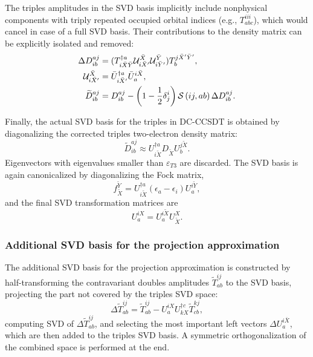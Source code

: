 \documentclass[a4paper,12pt,oneside]{book}
\newcommand{\half}{\frac{1}{2}}
\newcommand{\sop}[1]{{\cal S}\left(#1\right)}
\begin{document}
The triples amplitudes in the SVD basis implicitly include nonphysical 
components with triply repeated occupied orbital indices (e.g., $T_{abc}^{iii}$),
which would cancel in case of a full SVD basis. 
Their contributions to the density matrix can be explicitly isolated and removed:
\begin{equation}
\begin{aligned}
  \Delta D^{aj}_{ib} &= (T^{\dagger a}_{i \bar X \bar Y} \mathcal{U}^{\bar X}_{i \bar X'} \mathcal{U}^{\bar Y}_{i\bar Y'}) T^{j \bar X' \bar Y'}_{b},\\
  \mathcal{U}^{\bar X }_{i\bar X'} &= \bar U^{\dagger a}_{i \bar X'} \bar U^{i \bar X}_{a},\\
  \widetilde{D}^{aj}_{ib} &= D^{aj}_{ib} - \left(1 - \half\delta^i_j \right) \sop{ij,ab} \Delta D^{aj}_{ib}.
\end{aligned}
\end{equation}

Finally, the actual SVD basis for the triples in DC-CCSDT is obtained by 
diagonalizing the corrected triples two-electron density matrix:
\begin{equation}
\widetilde{D}^{aj}_{ib} \approx U^{\dagger a}_{i \tilde{X}} D_{\tilde{X}}
U^{j\tilde{X}}_{b}.
\end{equation}
Eigenvectors with eigenvalues smaller than $\varepsilon_{T3}$ are discarded.
The SVD basis is again canonicalized by diagonalizing the Fock matrix,
\begin{equation}
f_{\tilde{X}}^{\tilde{Y}}=U_{i\tilde{X}}^{\dagger a}
(\epsilon_a - \epsilon_i)U^{i\tilde{Y}}_{a},
\end{equation}
and the final SVD transformation matrices are
\begin{equation}
U^{iX}_{a}=U^{i\tilde{X}}_{a} U_{\tilde{X}}^{X}.
\end{equation}

\subsubsection{Additional SVD basis for the projection approximation}

The additional SVD basis for the projection approximation 
is constructed by half-transforming the contravariant doubles amplitudes 
$\widetilde{T}^{ij}_{ab}$ to the SVD basis, projecting the part not covered 
by the triples SVD space:
\begin{equation}
  \Delta \widetilde{T}^{ij}_{ab} = \widetilde{T}^{ij}_{ab} - U^{iX}_{a} U^{\dagger c}_{kX} \widetilde{T}^{kj}_{cb},
\end{equation}
computing SVD of $\Delta \widetilde{T}^{ij}_{ab}$, and selecting the most important left vectors 
$\Delta U^{i\bar X}_a$, which are then added to the triples SVD basis.
A symmetric orthogonalization of the combined space is performed at the end.
\end{document}
